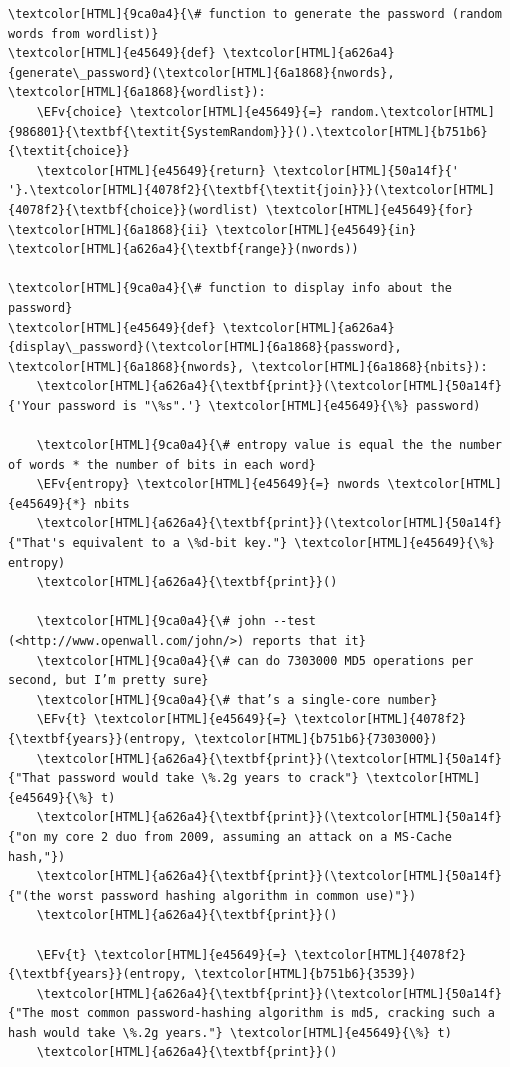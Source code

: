 \documentclass{scrartcl}
\newcommand{\EFv}[1]{\textcolor{EFv}{#1}} %
\begin{document}
\begin{Code}
\begin{Verbatim}[]
\textcolor[HTML]{9ca0a4}{\# function to generate the password (random words from wordlist)}
\textcolor[HTML]{e45649}{def} \textcolor[HTML]{a626a4}{generate\_password}(\textcolor[HTML]{6a1868}{nwords}, \textcolor[HTML]{6a1868}{wordlist}):
    \EFv{choice} \textcolor[HTML]{e45649}{=} random.\textcolor[HTML]{986801}{\textbf{\textit{SystemRandom}}}().\textcolor[HTML]{b751b6}{\textit{choice}}
    \textcolor[HTML]{e45649}{return} \textcolor[HTML]{50a14f}{' '}.\textcolor[HTML]{4078f2}{\textbf{\textit{join}}}(\textcolor[HTML]{4078f2}{\textbf{choice}}(wordlist) \textcolor[HTML]{e45649}{for} \textcolor[HTML]{6a1868}{ii} \textcolor[HTML]{e45649}{in} \textcolor[HTML]{a626a4}{\textbf{range}}(nwords))

\textcolor[HTML]{9ca0a4}{\# function to display info about the password}
\textcolor[HTML]{e45649}{def} \textcolor[HTML]{a626a4}{display\_password}(\textcolor[HTML]{6a1868}{password}, \textcolor[HTML]{6a1868}{nwords}, \textcolor[HTML]{6a1868}{nbits}):
    \textcolor[HTML]{a626a4}{\textbf{print}}(\textcolor[HTML]{50a14f}{'Your password is "\%s".'} \textcolor[HTML]{e45649}{\%} password)

    \textcolor[HTML]{9ca0a4}{\# entropy value is equal the the number of words * the number of bits in each word}
    \EFv{entropy} \textcolor[HTML]{e45649}{=} nwords \textcolor[HTML]{e45649}{*} nbits
    \textcolor[HTML]{a626a4}{\textbf{print}}(\textcolor[HTML]{50a14f}{"That's equivalent to a \%d-bit key."} \textcolor[HTML]{e45649}{\%} entropy)
    \textcolor[HTML]{a626a4}{\textbf{print}}()

    \textcolor[HTML]{9ca0a4}{\# john --test (<http://www.openwall.com/john/>) reports that it}
    \textcolor[HTML]{9ca0a4}{\# can do 7303000 MD5 operations per second, but I’m pretty sure}
    \textcolor[HTML]{9ca0a4}{\# that’s a single-core number}
    \EFv{t} \textcolor[HTML]{e45649}{=} \textcolor[HTML]{4078f2}{\textbf{years}}(entropy, \textcolor[HTML]{b751b6}{7303000})
    \textcolor[HTML]{a626a4}{\textbf{print}}(\textcolor[HTML]{50a14f}{"That password would take \%.2g years to crack"} \textcolor[HTML]{e45649}{\%} t)
    \textcolor[HTML]{a626a4}{\textbf{print}}(\textcolor[HTML]{50a14f}{"on my core 2 duo from 2009, assuming an attack on a MS-Cache hash,"})
    \textcolor[HTML]{a626a4}{\textbf{print}}(\textcolor[HTML]{50a14f}{"(the worst password hashing algorithm in common use)"})
    \textcolor[HTML]{a626a4}{\textbf{print}}()

    \EFv{t} \textcolor[HTML]{e45649}{=} \textcolor[HTML]{4078f2}{\textbf{years}}(entropy, \textcolor[HTML]{b751b6}{3539})
    \textcolor[HTML]{a626a4}{\textbf{print}}(\textcolor[HTML]{50a14f}{"The most common password-hashing algorithm is md5, cracking such a hash would take \%.2g years."} \textcolor[HTML]{e45649}{\%} t)
    \textcolor[HTML]{a626a4}{\textbf{print}}()


\end{Verbatim}
\end{Code}
\end{document}
